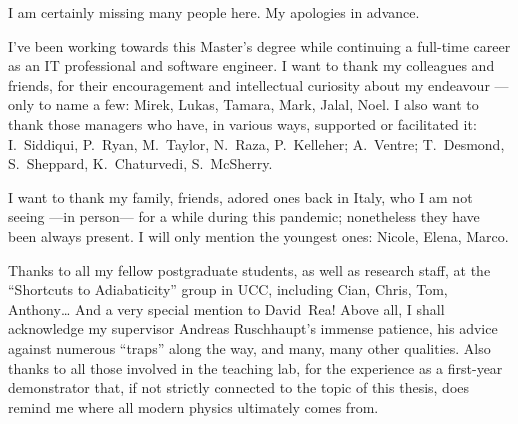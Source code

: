 {
  I am certainly missing many people here.
  My apologies in advance.

  I've been working towards this Master's degree
  while continuing a full-time career
  as an IT professional and software engineer.
  I want to thank my
  colleagues and friends, for their encouragement
  and intellectual curiosity
  about my endeavour
  ---only to name a few: Mirek, Lukas, Tamara, Mark, Jalal, Noel.
  I also want to thank those managers
  who have, in various ways, supported or facilitated it:
  I.~Siddiqui, P.~Ryan, M.~Taylor, N.~Raza, P.~Kelleher;
  A.~Ventre;
  T.~Desmond, S.~Sheppard, K.~Chaturvedi, S.~McSherry.

  I want to thank my family, friends, adored ones back in Italy,
  who I am not seeing ---in person--- for a while during this pandemic;
  nonetheless they have been always present. I will only mention the youngest ones:
  Nicole, Elena, Marco.

  Thanks to all my fellow postgraduate students,
  as well as research staff,
  at the ``Shortcuts to Adiabaticity'' group in UCC,
  including Cian, Chris, Tom, Anthony\dots
  And a very special mention to David~Rea!
  Above all, I shall acknowledge my supervisor Andreas Ruschhaupt's immense patience,
  his advice against numerous ``traps'' along the way, and many, many other qualities.
  Also thanks to all those involved in the teaching lab, for the experience as a
  first-year demonstrator that,
  if not strictly connected to the topic of this thesis,
  does remind me where all modern physics ultimately comes from.
}
